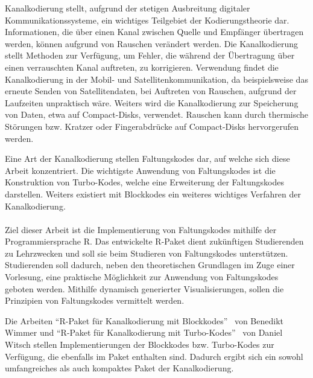 Kanalkodierung stellt, aufgrund der stetigen Ausbreitung digitaler Kommunikationssysteme, ein wichtiges Teilgebiet der Kodierungstheorie dar. Informationen, die über einen Kanal zwischen Quelle und Empfänger übertragen werden, können aufgrund von Rauschen verändert werden. Die Kanalkodierung stellt Methoden zur Verfügung, um Fehler, die während der Übertragung über einen verrauschten Kanal auftreten, zu korrigieren. Verwendung findet die Kanalkodierung in der Mobil- und Satellitenkommunikation, da beispielsweise das erneute Senden von Satellitendaten, bei Auftreten von Rauschen, aufgrund der Laufzeiten unpraktisch wäre. Weiters wird die Kanalkodierung zur Speicherung von Daten, etwa auf Compact-Disks, verwendet. Rauschen kann durch thermische Störungen bzw. Kratzer oder Fingerabdrücke auf Compact-Disks hervorgerufen werden.

Eine Art der Kanalkodierung stellen Faltungskodes dar, auf welche sich diese Arbeit konzentriert. Die wichtigste Anwendung von Faltungskodes ist die Konstruktion von Turbo-Kodes, welche eine Erweiterung der Faltungskodes darstellen. Weiters existiert mit Blockkodes ein weiteres wichtiges Verfahren der Kanalkodierung.
\\
\\
Ziel dieser Arbeit ist die Implementierung von Faltungskodes mithilfe der Programmiersprache R. Das entwickelte R-Paket dient zukünftigen Studierenden zu Lehrzwecken und soll sie beim Studieren von Faltungskodes unterstützen. Studierenden soll dadurch, neben den theoretischen Grundlagen im Zuge einer Vorlesung, eine praktische Möglichkeit zur Anwendung von Faltungskodes geboten werden. Mithilfe dynamisch generierter Visualisierungen, sollen die Prinzipien von Faltungskodes vermittelt werden.

Die Arbeiten \enquote{R-Paket für Kanalkodierung mit Blockkodes}~\cite{wimmer} von Benedikt Wimmer und \enquote{R-Paket für Kanalkodierung mit Turbo-Kodes}~\cite{witsch} von Daniel Witsch stellen Implementierungen der Blockkodes bzw. Turbo-Kodes zur Verfügung, die ebenfalls im Paket enthalten sind. Dadurch ergibt sich ein sowohl umfangreiches als auch kompaktes Paket der Kanalkodierung.